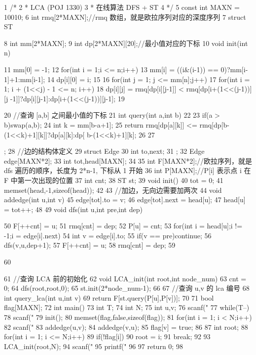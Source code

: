 \documentclass[11pt]{article}
\begin{document}
\begin{Code}
 1    /*
 2     * LCA (POJ 1330)
 3     * 在线算法 DFS + ST
 4     */
 5    const int MAXN = 10010;
 6    int rmq[2*MAXN];//rmq 数组，就是欧拉序列对应的深度序列
 7    struct ST{
 8        int mm[2*MAXN];
 9        int dp[2*MAXN][20];//最小值对应的下标
10        void init(int n){


11              mm[0] = -1;
12              for(int i = 1;i <= n;i++){
13                  mm[i] = ((i&(i-1)) == 0)?mm[i-1]+1:mm[i-1];
14                  dp[i][0] = i;
15              }
16              for(int j = 1; j <= mm[n];j++)
17                  for(int i = 1; i + (1<<j) - 1 <= n; i++)
18                      dp[i][j] = rmq[dp[i][j-1]] < rmq[dp[i+(1<<(j-1))][j
                           -1]]?dp[i][j-1]:dp[i+(1<<(j-1))][j-1];
19       }
20       //查询 [a,b] 之间最小值的下标
21       int query(int a,int b)
22       {
23           if(a > b)swap(a,b);
24           int k = mm[b-a+1];
25           return rmq[dp[a][k]] <= rmq[dp[b-(1<<k)+1][k]]?dp[a][k]:dp[
                b-(1<<k)+1][k];
26       }
27   };
28   //边的结构体定义
29   struct Edge{
30       int to,next;
31   };
32   Edge edge[MAXN*2];
33   int tot,head[MAXN];
34
35   int F[MAXN*2];//欧拉序列，就是 dfs 遍历的顺序，长度为 2*n-1, 下标从 1 开始
36   int P[MAXN];//P[i] 表示点 i 在 F 中第一次出现的位置
37   int cnt;
38   ST st;
39   void init(){
40       tot = 0;
41       memset(head,-1,sizeof(head));
42   }
43   //加边，无向边需要加两次
44   void addedge(int u,int v){
45       edge[tot].to = v;
46       edge[tot].next = head[u];
47       head[u] = tot++;
48   }
49   void dfs(int u,int pre,int dep){
50       F[++cnt] = u;
51       rmq[cnt] = dep;
52       P[u] = cnt;
53       for(int i = head[u];i != -1;i = edge[i].next){
54           int v = edge[i].to;
55           if(v == pre)continue;
56           dfs(v,u,dep+1);
57           F[++cnt] = u;
58           rmq[cnt] = dep;
59       }


60   }
61   //查询 LCA 前的初始化
62   void LCA_init(int root,int node_num){
63       cnt = 0;
64       dfs(root,root,0);
65       st.init(2*node_num-1);
66   }
67   //查询 u,v 的 lca 编号
68   int query_lca(int u,int v){
69       return F[st.query(P[u],P[v])];
70   }
71   bool flag[MAXN];
72   int main(){
73       int T;
74       int N;
75       int u,v;
76       scanf("%
77       while(T--){
78           scanf("%
79           init();
80           memset(flag,false,sizeof(flag));
81           for(int i = 1; i < N;i++){
82                scanf("%
83                addedge(u,v);
84                addedge(v,u);
85                flag[v] = true;
86           }
87           int root;
88           for(int i = 1; i <= N;i++)
89                if(!flag[i]){
90                    root = i;
91                    break;
92                }
93           LCA_init(root,N);
94           scanf("%
95           printf("%
96       }
97       return 0;
98   }
\end{Code}
\end{document}
